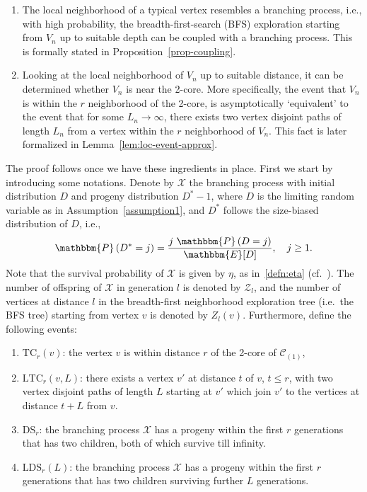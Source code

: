 \documentclass[11pt,a4paper, reqno]{article}
\numberwithin{equation}{section}
\numberwithin{equation}{section}
\def\sss{\scriptscriptstyle}
\newcommand{\prob}[1]{\ensuremath{\mathbbm{P}\left(#1\right)}}
\newcommand{\E}{\ensuremath{\mathbbm{E}}}
\newcommand{\1}{\ensuremath{\mathbbm{1}}}
\numberwithin{equation}{section}
\numberwithin{theorem}{section}
\begin{document}
\begin{enumerate}[{\normalfont (i)}]
\item  The local neighborhood of a typical vertex resembles a branching process,
i.e., with high probability, the breadth-first-search (BFS) exploration starting from $V_n$ up to suitable depth can be coupled with a branching process. This is formally stated in Proposition~\ref{prop-coupling}.
\item Looking at the local neighborhood of $V_n$ up to suitable distance, it can be determined whether $V_n$ is near the 2-core.
More specifically,  the event that $V_n$ is within the $r$ neighborhood of the 2-core, is asymptotically  `equivalent' to the event that for some $L_n \to \infty$,  there exists two vertex disjoint paths of length $L_n$ from a vertex within the $r$ neighborhood of $V_n$.
This fact is later formalized in Lemma~\ref{lem:loc-event-approx}. 
\end{enumerate}
The proof follows once we have these ingredients in place. 
First we start by introducing some notations. 
Denote by $\mathcal{X}$ the branching process with initial distribution $D$ and progeny distribution $D^*-1$,
where $D$ is the limiting random variable as in Assumption~\ref{assumption1}, and $D^*$ follows the size-biased distribution of $D$, i.e., 
$$\prob{D^*=j}= \frac{j\ \prob{D=j}}{\E[D]}, \quad j\geq 1.$$
Note that the survival probability of $\mathcal{X}$ is given by $\eta$, as in~\eqref{defn:eta} (cf.~\cite{JL09}).
The number of offspring of $\mathcal{X}$ in generation $l$
is denoted by $\mathcal{Z}_l$, and  the number of vertices at distance $l$ in the breadth-first neighborhood exploration tree (i.e.~the BFS tree) starting from vertex $v$ is denoted by $Z_l(v)$.
Furthermore, define the following events:
\begin{enumerate}[{\normalfont (a)}]
\item $\mathrm{TC}_r(v)$: the vertex $v$ is within distance $r$ of the 2-core of $\mathscr{C}_{\sss (1)}$,
\item $\mathrm{LTC}_r(v,L)$: there exists a vertex $v'$ at distance $t$ of $v$, $t\leq r$, with two vertex disjoint paths of length $L$ starting at $v'$  which join $v'$ to the vertices at distance $t+L$ from $v$.
\item $\mathrm{DS}_r$:  the branching process $\mathcal{X}$ has a progeny within the first $r$ generations that has two children, both of which survive till infinity. 
\item $\mathrm{LDS}_r(L)$: the branching process $\mathcal{X}$ has a progeny within the first $r$ generations that has two children surviving further $L$ generations.
\end{enumerate}
\end{document}
